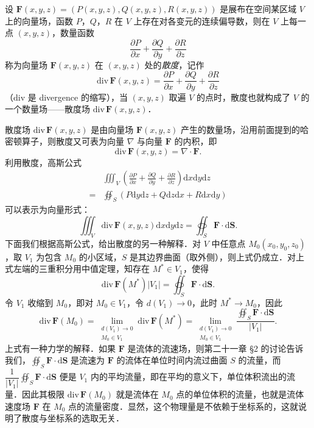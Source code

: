 设 $\bm{F}(x,y,z)=\left(P(x,y,z),Q(x,y,z),R(x,y,z)\right)$ 是展布在空间某区域 $V$ 上的向量场，函数 $P$，$Q$，$R$ 在 $V$ 上存在对各变元的连续偏导数，则在 $V$ 上每一点 $(x,y,z)$，数量函数
\[
\frac{\partial P}{\partial x}+\frac{\partial Q}{\partial y}+\frac{\partial R}{\partial z}
\]
称为向量场 $\bm{F}(x,y,z)$ 在 $(x,y,z)$ 处的\emph{散度}，记作
\[
\mathrm{div}\,\bm{F}(x,y,z)=\frac{\partial P}{\partial x}+\frac{\partial Q}{\partial y}+\frac{\partial R}{\partial z}
\]
（$\mathrm{div}$ 是 divergence 的缩写），当 $(x,y,z)$ 取遍 $V$ 的点时，散度也就构成了 $V$ 的一个数量场——散度场 $\mathrm{div}\,\bm{F}(x,y,z)$．

散度场 $\mathrm{div}\,\bm{F}(x,y,z)$ 是由向量场 $\bm{F}(x,y,z)$ 产生的数量场，沿用前面提到的哈密顿算子，则散度又可表为向量 $\nabla$ 与向量 $\bm{F}$ 的内积，即
\[
\mathrm{div}\,\bm{F}(x,y,z)=\nabla\cdot\bm{F}.
\]
利用散度，高斯公式
\[
\begin{aligned}
&\iiint_{V}\left(\frac{\partial P}{\partial x}+\frac{\partial Q}{\partial y}+\frac{\partial R}{\partial z}\right)\mathrm{d}x\mathrm{d}y\mathrm{d}z\\
=&\oiint_{S}\left(P\mathrm{d}y\mathrm{d}z+Q\mathrm{d}z\mathrm{d}x+R\mathrm{d}x\mathrm{d}y\right)
\end{aligned}
\]
可以表示为向量形式：
\[
\iiint_{V}\mathrm{div}\,\bm{F}(x,y,z)\mathrm{d}x\mathrm{d}y\mathrm{d}z=\oiint_{S}\bm{F}\cdot\mathrm{d}\bm{S}.
\]
下面我们根据高斯公式，给出散度的另一种解释．对 $V$ 中任意点 $M_{0}(x_{0},y_{0},z_{0})$，取 $V_{1}$ 为包含 $M_{0}$ 的小区域，$S$ 是其边界曲面（取外侧），则上式仍成立．对上式左端的三重积分用中值定理，知存在 $M^{*}\in V_{1}$，使得
\[
\mathrm{div}\,\bm{F}(M^{*})\left|V_{1}\right|=\oiint_{S}\bm{F}\cdot\mathrm{d}\bm{S}.
\]
令 $V_{1}$ 收缩到 $M_{0}$，即对 $M_{0}\in V_{1}$，令 $d(V_{1})\to 0$，此时 $M^{*}\to M_{0}$，因此
\[
\mathrm{div}\,\bm{F}(M_{0})=\lim_{\substack{d(V_{1})\to 0\\ M_{0}\in V_{1}}}\mathrm{div}\,\bm{F}(M^{*})=\lim_{\substack{d(V_{1})\to 0\\ M_{0}\in V_{1}}}\frac{\displaystyle\oiint_{S}\bm{F}\cdot\mathrm{d}\bm{S}}{\left|V_{1}\right|}.
\]
上式有一种力学的解释．如果 $\bm{F}$ 是流体的流速场，则第二十一章 §2 的讨论告诉我们，$\displaystyle\oiint_{S}\bm{F}\cdot\mathrm{d}\bm{S}$ 是流速为 $\bm{F}$ 的流体在单位时间内流过曲面 $S$ 的流量，而 $\dfrac{1}{\left|V_{1}\right|}\displaystyle\oiint_{S}\bm{F}\cdot\mathrm{d}\bm{S}$ 便是 $V_{1}$ 内的平均流量，即在平均的意义下，单位体积流出的流量．因此其极限 $\mathrm{div}\,\bm{F}(M_{0})$ 就是流体在 $M_{0}$ 点的单位体积的流量，也就是流体速度场 $\bm{F}$ 在 $M_{0}$ 点的流量密度．显然，这个物理量是不依赖于坐标系的，这就说明了散度与坐标系的选取无关．

